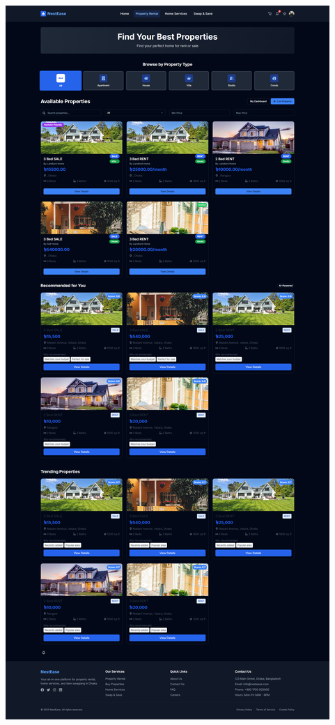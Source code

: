 \documentclass[conference]{IEEEtran}
\begin{document}
\begin{center}
 \hfill
\begin{minipage}[t]{0.45\textwidth}
\includegraphics[width=\linewidth]{Project Screenshot/Propert Rental.png}
\end{minipage}


\end{center}
\end{document}

